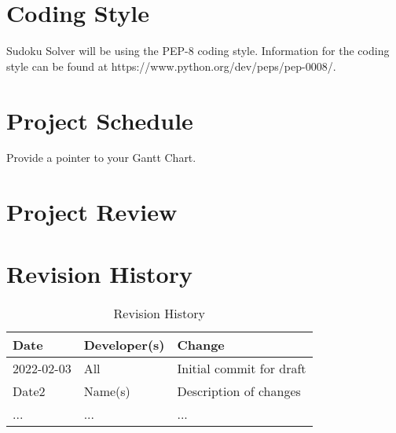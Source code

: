 \documentclass[11pt]{article}
\begin{document}
\section{Coding Style}

Sudoku Solver will be using the PEP-8 coding style. Information for the coding style can be found at https://www.python.org/dev/peps/pep-0008/. 

\section{Project Schedule}

Provide a pointer to your Gantt Chart.

\section{Project Review}

\section{Revision History}
\begin{table}[hp]
\caption{Revision History} \label{TblRevisionHistory}
\begin{tabularx}{\textwidth}{llX}
\toprule
\textbf{Date} & \textbf{Developer(s)} & \textbf{Change}\\
\midrule
2022-02-03 & All & Initial commit for draft\\
Date2 & Name(s) & Description of changes\\
... & ... & ...\\
\bottomrule
\end{tabularx}
\end{table}
\end{document}

